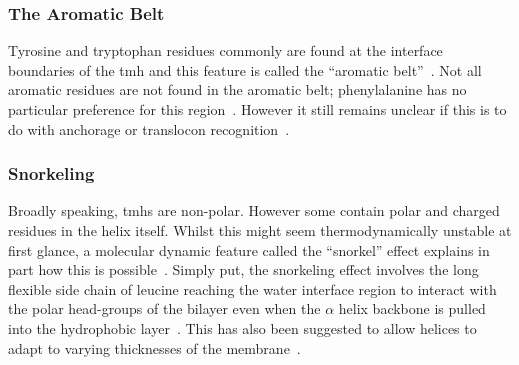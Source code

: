 \subsubsection{The Aromatic Belt}

 Tyrosine and tryptophan residues commonly are found at the interface boundaries of the \gls{tmh} and this feature is called the ``aromatic belt''~\cite{Hessa2005, Granseth2005, Sharpe2010, Baeza-Delgado2013, Nilsson2005}. Not all aromatic residues are not found in the aromatic belt; phenylalanine has no particular preference for this region~\cite{Granseth2005, Braun1999}. However it still remains unclear if this is to do with anchorage or translocon recognition~\cite{Baeza-Delgado2013}.


\subsubsection{Snorkeling}

Broadly speaking, \gls{tmh}s are non-polar. However some contain polar and  charged residues in the helix itself. Whilst this might seem thermodynamically unstable at first glance, a molecular dynamic feature called the ``snorkel'' effect explains in part how this is possible~\cite{Chamberlain2004, Strandberg2003}. Simply put, the snorkeling effect involves the long flexible side chain of leucine reaching the water interface region to interact with the polar head-groups of the bilayer even when the $\alpha$ helix backbone is pulled into the hydrophobic layer~\cite{Krishnakumar2007}. This has also been suggested to allow helices to adapt to varying thicknesses of the membrane~\cite{Kandasamy2006}.


